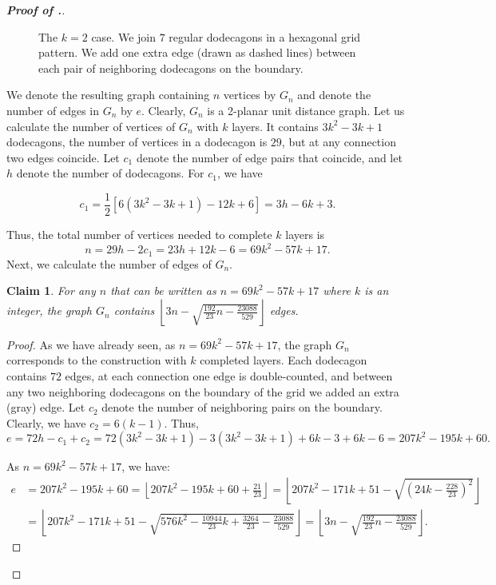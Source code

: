 \documentclass[10pt,a4paper]{amsart}
\newtheorem{claim}{Claim}
\begin{document}
\begin{proof}[\bf Proof of .]
\begin{figure}[ht!]
        \caption{The $k=2$ case. We join $7$ regular dodecagons in a hexagonal grid pattern. We add one extra edge (drawn as dashed lines) between each pair of neighboring dodecagons on the boundary.}
        \label{k=2}
    \end{figure}    


We denote the resulting graph containing $n$ vertices by $G_n$ and denote the number of edges in $G_n$ by $e$. Clearly, $G_n$ is a 2-planar unit distance graph.
Let us calculate the number of vertices of $G_n$ with $k$ layers. It contains $3k^2-3k+1$ dodecagons, the number of vertices in a dodecagon is $29$, but at any connection two edges coincide. Let $c_1$ denote the number of edge pairs that coincide, and let $h$ denote the number of dodecagons. For $c_1$, we have
    
$$c_1=\frac12 \left[6(3k^2-3k+1)-12k+6 \right]=3h-6k+3.$$
    
Thus, the total number of vertices needed to complete $k$ layers is $$n=29h-2c_1=23h+12k-6=69k^2-57k+17.$$ 
Next, we calculate the number of edges of $G_n$.

\begin{claim} \label{specialcase}
For any $n$ that can be written as $n=69k^2-57k+17$ where $k$ is an integer, the graph $G_n$ contains
$\left\lfloor3n-\sqrt{\frac{192}{23}n-\frac{23088}{529}}\right\rfloor$ edges.
\end{claim}

\begin{proof}
As we have already seen, as $n=69k^2-57k+17$, 
the graph $G_n$ corresponds to the construction with $k$ completed layers.
Each dodecagon contains $72$ edges, at each connection one edge is double-counted, and between any two neighboring dodecagons on the boundary of the grid we added an extra (gray) edge. Let $c_2$ denote the number of neighboring pairs on the boundary. Clearly, we have $c_2=6(k-1)$. Thus,    
$$e =72h-c_1+c_2=72(3k^2-3k+1)-3(3k^2-3k+1)+6k-3+6k-6= 207k^2-195k+60.$$

    As $n=69k^2-57k+17$, we have:
   \begin{align*}
e &=207k^2-195k+60=\left\lfloor207k^2-195k+60+\frac{21}{23}\right\rfloor=\left\lfloor207k^2-171k+51-\sqrt{\left(24k-\frac{228}{23}\right)^2}\right\rfloor
\\
&=\left\lfloor207k^2-171k+51-\sqrt{576k^2-\frac{10944}{23}k+\frac{3264}{23}-\frac{23088}{529}}\right\rfloor=\left\lfloor3n-\sqrt{\frac{192}{23}n-\frac{23088}{529}}\right\rfloor.
    \end{align*}


\end{proof}
\end{proof}
\end{document}
